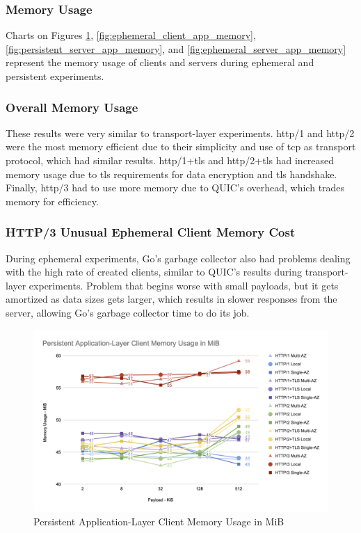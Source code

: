 \subsubsection{Memory Usage}

Charts on Figures \ref{fig:persistent_client_app_memory}, \ref{fig:ephemeral_client_app_memory}, \ref{fig:persistent_server_app_memory}, and \ref{fig:ephemeral_server_app_memory} represent the memory usage of clients and servers during ephemeral and persistent experiments.

\subsubsection*{Overall Memory Usage}

These results were very similar to transport-layer experiments. \gls{http}/1 and \gls{http}/2 were the most memory efficient due to their simplicity and use of \gls{tcp} as transport protocol, which had similar results. \gls{http}/1+\gls{tls} and \gls{http}/2+\gls{tls} had increased memory usage due to \gls{tls} requirements for data encryption and \gls{tls} handshake. Finally, \gls{http}/3 had to use more memory due to QUIC’s overhead, which trades memory for efficiency.

\subsubsection*{HTTP/3 Unusual Ephemeral Client Memory Cost}

During ephemeral experiments, Go’s garbage collector also had problems dealing with the high rate of created clients, similar to QUIC's results during transport-layer experiments. Problem that begins worse with small payloads, but it gets amortized as data sizes gets larger, which results in slower responses from the server, allowing Go’s garbage collector time to do its job.

\clearpage

\begin{figure}[h!]
    \centering
    \includegraphics[width=\linewidth]{figures/charts/Persistent Application-Layer Client Memory Usage in MiB.png}
    \caption{Persistent Application-Layer Client Memory Usage in MiB}
    \label{fig:persistent_client_app_memory}
\end{figure}

